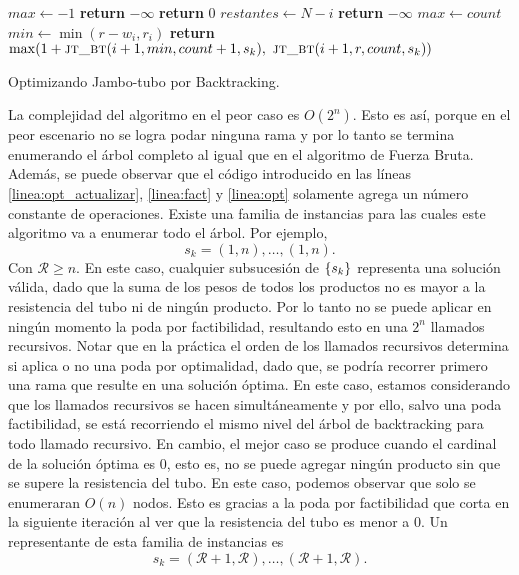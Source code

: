 \documentclass{article}
\DeclarePairedDelimiter\curl{\{}{\}}
\newcommand{\Res}{\mathcal{R}}
\begin{document}
\begin{algorithm}
\begin{algorithmic}[1]
\State $max \gets -1$
     {\textbf{return} $-\infty$ \label{linea:fact}} 
     {\textbf{return} $0$}
    \State $restantes \gets N - i$
     {\textbf{return} $-\infty$} \label{linea:opt}
     {$max \gets count$ \label{linea:opt_actualizar}}
    \State $min \gets \min(r - w_i, r_i)$ \label{linea:fact_actualizar}
    \State \textbf{return} $\max(1 + \textsc{jt\_bt}(i+1, min, count+1, s_{k}),\ \textsc{jt\_bt}(i+1, r, count, s_{k}))$
\EndFunction
\end{algorithmic}
\caption{Optimizando Jambo-tubo por Backtracking.}
\label{alg:backtracking}
\end{algorithm}

La complejidad del algoritmo en el peor caso es $O(2^n)$. Esto es así, porque en el peor escenario no se logra podar ninguna rama y por lo tanto se termina enumerando el árbol completo al igual que en el algoritmo de Fuerza Bruta. Además, se puede observar que el código introducido en las líneas \ref{linea:opt_actualizar}, \ref{linea:fact} y \ref{linea:opt} solamente agrega un número constante de operaciones. Existe una familia de instancias para las cuales este algoritmo va a enumerar todo el árbol. Por ejemplo,
\[
    s_{k}=(1,n), \hdots, (1,n).
\]
Con $\Res \geq n$. En este caso, cualquier subsucesión de $\curl{s_{k}}$ representa una solución válida, dado que la suma de los pesos de todos los productos no es mayor a la resistencia del tubo ni de ningún producto. Por lo tanto no se puede aplicar en ningún momento la poda por factibilidad, resultando esto en una $2^{n}$ llamados recursivos. Notar que en la práctica el orden de los llamados recursivos determina si aplica o no una poda por optimalidad, dado que, se podría recorrer primero una rama que resulte en una solución óptima. En este caso, estamos considerando que los llamados recursivos se hacen simultáneamente y por ello, salvo una poda factibilidad, se está recorriendo el mismo nivel del árbol de backtracking para todo llamado recursivo.
En cambio, el mejor caso se produce cuando el cardinal de la solución óptima es 0, esto es, no se puede agregar ningún producto sin que se supere la resistencia del tubo. En este caso, podemos observar que solo se enumeraran $O(n)$ nodos. Esto es gracias a la poda por factibilidad que corta en la siguiente iteración al ver que la resistencia del tubo es menor a 0. Un representante de esta familia de instancias es
\[
    s_{k} = (\Res+1, \Res), \hdots, (\Res + 1, \Res).
\]
\end{document}
